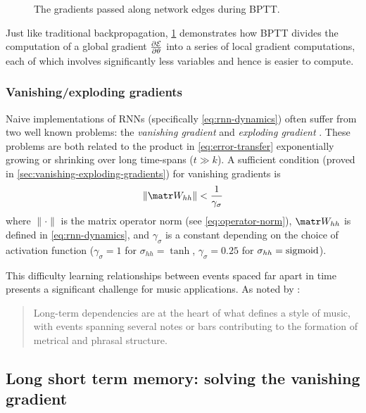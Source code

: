 \begin{figure}[tb]
    \centering
    
    \caption{The gradients passed along network edges during BPTT.}
    \label{fig:rnn-bptt}
\end{figure}

Just like traditional backpropagation, \cref{fig:rnn-bptt} demonstrates how
BPTT divides the computation of a global gradient $\frac{\partial \mathcal{E}}{\partial
\theta}$ into a series of local gradient computations, each of which involves
significantly less variables and hence is easier to compute.

\subsubsection{Vanishing/exploding gradients}

Naive implementations of RNNs (specifically \cref{eq:rnn-dynamics}) often
suffer from two well known problems: the \emph{vanishing gradient} and
\emph{exploding gradient} \citep{Bengio1994}. These problems are both related
to the product in \cref{eq:error-transfer} exponentially growing or shrinking
over long time-spans (\ie $t \gg k$). A sufficient condition (proved in
\vref{sec:vanishing-exploding-gradients}) for vanishing gradients is
\begin{equation}\label{eq:vanishing-gradients-suff}
  \left\| \W_{hh} \right\| < \frac{1}{\gamma_\sigma}
\end{equation}
where $\| \cdot \|$ is the matrix operator norm (see \vref{eq:operator-norm}),
$\W_{hh}$ is defined in \vref{eq:rnn-dynamics},
and $\gamma_\sigma$ is a constant depending on the choice of activation function
(\eg $\gamma_\sigma = 1$ for $\sigma_{hh} = \tanh$, $\gamma_\sigma = 0.25$ for
$\sigma_{hh} = \operatorname*{sigmoid}$).

This difficulty learning relationships between events spaced far apart in time
presents a significant challenge for music applications. As noted by
\citet{cooper1963rhythmic}:
\begin{quote}
  Long-term dependencies are at the heart of what defines a style of music, with
  events spanning several notes or bars contributing to the formation of metrical and phrasal
  structure.
\end{quote}

\subsection{Long short term memory: solving the vanishing gradient}\label{sec:LSTM}

